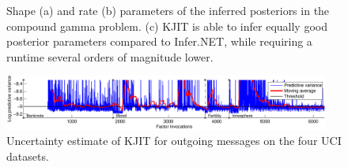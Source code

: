 \documentclass[english]{article}
\theoremstyle{plain}
\theoremstyle{plain}
\begin{document}
\begin{figure}[ht]
  \centering
  \caption{Shape (a) and rate (b) parameters of the inferred posteriors in 
  the compound gamma problem. 
  (c) KJIT is able to infer equally good posterior parameters compared to Infer.NET, 
  while requiring a runtime several orders of magnitude lower. }
  \label{fig:cg_performance}
\end{figure}


\begin{figure}[t]
\centering
\includegraphics[width=0.95\textwidth]{img/online/uci_temporal_uncertainty-crop}
\caption{
Uncertainty estimate of KJIT for outgoing messages on the four UCI datasets.
\label{fig:uci_temporal_uncertainty}
}
\end{figure}
\end{document}
